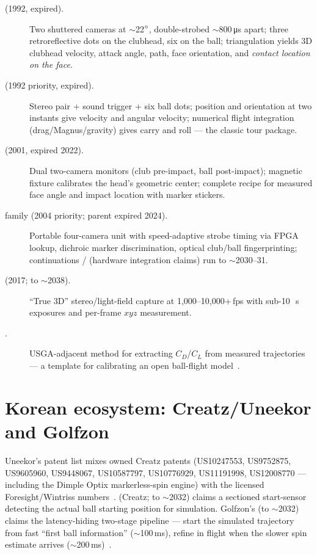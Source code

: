 \begin{description}
\item[ (1992, expired).] Two shuttered cameras at
$\sim$22$\si{\degree}$, double-strobed $\sim$800\,\si{\micro\second} apart;
three retroreflective dots on the clubhead, six on the ball;
triangulation yields 3D clubhead velocity, attack angle, path, face
orientation, and \emph{contact location on the face}.
\item[ (1992 priority, expired).] Stereo pair + sound
trigger + six ball dots; position and orientation at two instants give
velocity and angular velocity; numerical flight integration
(drag/Magnus/gravity) gives carry and roll --- the classic tour package.
\item[ (2001, expired 2022).] Dual two-camera
monitors (club pre-impact, ball post-impact); magnetic fixture calibrates
the head's geometric center; complete recipe for measured face angle and
impact location with marker stickers.
\item[ family (2004 priority; parent expired 2024).]
Portable four-camera unit with speed-adaptive strobe timing via FPGA
lookup, dichroic marker discrimination, optical club/ball fingerprinting;
continuations / (hardware
integration claims) run to $\sim$2030--31.
\item[ (2017; to $\sim$2038).] ``True 3D''
stereo/light-field capture at 1,000--10,000+\,fps with sub-10\,\si{\micro
\second} exposures and per-frame $xyz$ measurement.
\item[.] USGA-adjacent method for extracting
$C_D$/$C_L$ from measured trajectories --- a template for calibrating an
open ball-flight model~\cite{us6186002}.
\end{description}

\section{Korean ecosystem: Creatz/Uneekor and Golfzon}

Uneekor's patent list mixes owned Creatz patents (US10247553, US9752875,
US9605960, US9448067, US10587797, US10776929, US11191998, US12008770 ---
including the Dimple Optix markerless-spin engine) with the licensed
Foresight/Wintriss numbers~\cite{uneekorpatents}.
 (Creatz; to $\sim$2032) claims a sectioned
start-sensor detecting the actual ball starting position for simulation.
Golfzon's  (to $\sim$2032) claims the latency-hiding
two-stage pipeline --- start the simulated trajectory from fast
``first ball information'' ($\sim$100\,ms), refine in flight when the
slower spin estimate arrives ($\sim$200\,ms)~\cite{us9242158}.

